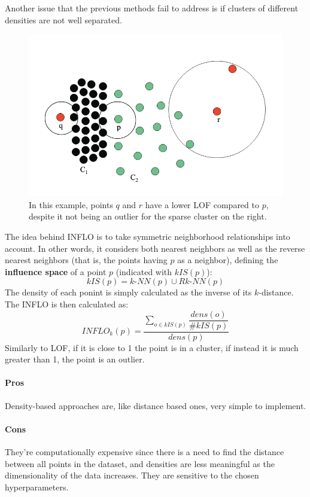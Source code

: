 Another issue that the previous methods fail to address is if clusters of different densities are not well separated.
\begin{figure}[ht]
    \centering
    \includegraphics[width=0.5\linewidth]{img/inflo.png}
    \caption{In this example, points $q$ and $r$ have a lower LOF compared to $p$, despite it not being an outlier for the sparse cluster on the right.}
    \label{fig:inflo}
\end{figure}
The idea behind INFLO is to take symmetric neighborhood relationships into account. In other words, it considers both nearest neighbors as well as the reverse nearest neighbors (that is, the points having $p$ as a neighbor), defining the \textbf{influence space} of a point $p$ (indicated with $kIS(p)$):
\begin{equation*}
    kIS(p) = \textit{k-NN}(p) \cup \textit{Rk-NN}(p)
\end{equation*}    
The density of each ponint is simply calculated as the inverse of its $k$-distance. The INFLO is then calculated as:\begin{equation*}
    \textit{INFLO}_k(p) = \dfrac{\sum_{o \in kIS(p)} \dfrac{\textit{dens}(o)}{\# kIS(p)}}{dens(p)}
\end{equation*}
Similarly to LOF, if it is close to 1 the point is in a cluster, if instead it is much greater than 1, the point is an outlier.

\paragraph{Pros} Density-based approaches are, like distance based ones, very simple to implement.

\paragraph{Cons} They're computationally expensive since there is a need to find the distance between all points in the dataset, and densities are less meaningful as the dimensionality of the data increases. They are sensitive to the chosen hyperparameters.

